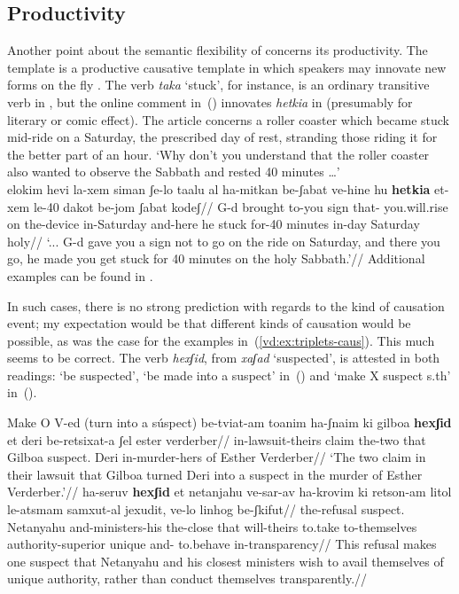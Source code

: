 	\subsection{Productivity} \label{vd:caus:product}
Another point about the semantic flexibility of {\vd} concerns its productivity. The template {\thif} is a productive causative template in which speakers may innovate new forms on the fly \citep{lev16}. The verb \emph{taka} `stuck', for instance, is an ordinary transitive verb in {\tkal}, but the online comment in~(\nextx) innovates \emph{hetkia} in {\thif} (presumably for literary or comic effect). The article concerns a roller coaster which became stuck mid-ride on a Saturday, the prescribed day of rest, stranding those riding it for the better part of an hour.
\ex `Why don't you understand that the roller coaster also wanted to observe the Sabbath and rested 40 minutes {\dots}' \\
	\begingl
	 elokim hevi la-xem siman ʃe-lo taalu al ha-mitkan be-ʃabat ve-hine hu \textbf{hetkia} et-xem le-40 dakot be-jom ʃabat kodeʃ//
	\glb {} G-d brought to-you sign that- you.will.rise on the-device in-Saturday and-here he stuck  for-40 minutes in-day Saturday holy//
	\glft `{...} G-d gave you a sign not to go on the ride on Saturday, and there you go, he made you get stuck for 40 minutes on the holy Sabbath.'//
	\endgl	
\xe
Additional examples can be found in \cite{lev16}.

In such cases, there is no strong prediction with regards to the kind of causation event; my expectation would be that different kinds of causation would be possible, as was the case for the examples in~(\ref{vd:ex:triplets-caus}). This much seems to be correct. The verb \emph{hexʃid}, from \emph{xaʃad} `suspected', is attested in both readings: `be suspected', `be made into a suspect' in~(\nextx) and `make X suspect s.th' in~(\anextx).

\pex Make O V-ed (turn into a súspect)
	\a \begingl
		\gla be-tviat-am toanim ha-ʃnaim ki gilboa \textbf{hexʃid} et deri be-re{ts}ixat-a ʃel ester verderber//
		\glb in-lawsuit-theirs claim the-two that Gilboa suspect.  Deri in-murder-hers of Esther Verderber//
		\glft `The two claim in their lawsuit that Gilboa turned Deri into a suspect in the murder of Esther Verderber.'//
	\endgl
	\a \begingl
		\gla ha-seruv \textbf{hexʃid} et netanjahu ve-sar-av ha-krovim ki re{ts}on-am litol le-a{ts}mam samxut-al jexudit, ve-lo linhog be-ʃkifut//
		\glb the-refusal suspect.  Netanyahu and-ministers-his the-close that will-theirs to.take to-themselves authority-superior unique and- to.behave in-transparency//
		\glft This refusal makes one suspect that Netanyahu and his closest ministers wish to avail themselves of unique authority, rather than conduct themselves transparently.//
	\endgl
\xe
	
